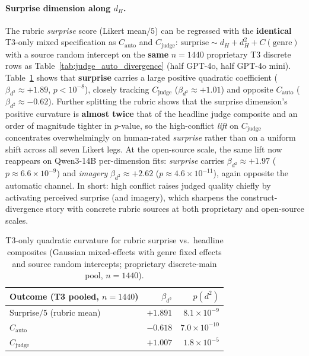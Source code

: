 \documentclass[sigconf,nonacm]{acmart}
\begin{document}
\paragraph{Surprise dimension along $d_H$.}
The rubric \emph{surprise} score (Likert mean$/5$) can be regressed with the \textbf{identical} T3-only mixed specification as $C_{\mathrm{auto}}$ and $C_{\mathrm{judge}}$: $\mathrm{surprise}{\sim} d_H{+}d_H^2{+}C(\mathrm{genre})$ with a source random intercept on the \textbf{same} $n{=}1440$ proprietary T3 discrete rows as Table~\ref{tab:judge_auto_divergence} (half GPT-4o, half GPT-4o mini).
Table~\ref{tab:surprise_curvature} shows that \textbf{surprise} carries a large positive quadratic coefficient ($\beta_{d^2}{\approx}{+}1.89$, $p{<}10^{-8}$), closely tracking $C_{\mathrm{judge}}$ ($\beta_{d^2}{\approx}{+}1.01$) and opposite $C_{\mathrm{auto}}$ ($\beta_{d^2}{\approx}{-}0.62$).
Further splitting the rubric shows that the surprise dimension's positive curvature is \textbf{almost twice} that of the headline judge composite and an order of magnitude tighter in $p$-value, so the high-conflict \emph{lift} on $C_{\mathrm{judge}}$ concentrates overwhelmingly on human-rated \emph{surprise} rather than on a uniform shift across all seven Likert legs.
At the open-source scale, the same lift now reappears on Qwen3-14B per-dimension fits: \emph{surprise} carries $\beta_{d^2}{\approx}{+}1.97$ ($p{\approx}6.6{\times}10^{-9}$) and \emph{imagery} $\beta_{d^2}{\approx}{+}2.62$ ($p{\approx}4.6{\times}10^{-11}$), again opposite the automatic channel.
In short: high conflict raises judged quality chiefly by activating perceived surprise (and imagery), which sharpens the construct-divergence story with concrete rubric sources at both proprietary and open-source scales.

\begin{table}[t]
\centering
\small
\begin{tabular}{lrr}
\toprule
Outcome (T3 pooled, $n{=}1440$) & $\beta_{d^2}$ & $p(d^2)$ \\
\midrule
Surprise$/5$ (rubric mean) & $+1.891$ & $8.1{\times}10^{-9}$ \\
$C_{\mathrm{auto}}$ & $-0.618$ & $7.0{\times}10^{-10}$ \\
$C_{\mathrm{judge}}$ & $+1.007$ & $1.8{\times}10^{-5}$ \\
\bottomrule
\end{tabular}
\caption{T3-only quadratic curvature for rubric surprise vs.\ headline composites (Gaussian mixed-effects with genre fixed effects and source random intercepts; proprietary discrete-main pool, $n{=}1440$).}
\label{tab:surprise_curvature}
\end{table}
\end{document}
